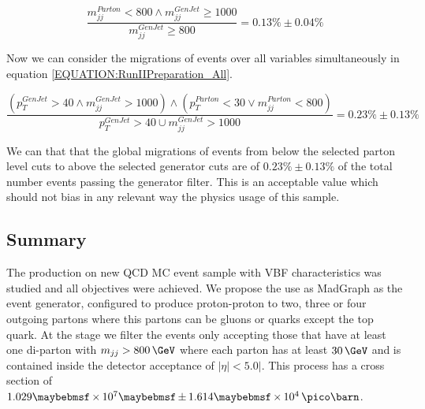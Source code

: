 \begin{equation}
\label{EQUATION:RunIIPreparation_SigleVariableMigrationMjj}
\frac{m_{jj}^{Parton}<800 \wedge m_{jj}^{GenJet} \geq 1000}{m_{jj}^{GenJet} \geq 800}=0.13\% \pm 0.04\%
\end{equation}
\normalsize

Now we can consider the migrations of events over all variables simultaneously in equation \ref{EQUATION:RunIIPreparation_All}.

\small
\begin{equation}
\label{EQUATION:RunIIPreparation_All}
\frac{(p_{T}^{GenJet}>40 \wedge m_{jj}^{GenJet}>1000) \wedge (p_{T}^{Parton}<30 \vee m_{jj}^{Parton}<800)}{p_{T}^{GenJet}>40 \cup m_{jj}^{GenJet}>1000} = 0.23\% \pm 0.13\%
\end{equation}
\normalsize

We can that that the global migrations of events from below the selected parton level cuts to above the selected generator cuts are of $0.23\% \pm 0.13\%$ of the total number events passing the generator filter. This is an acceptable value which should not bias in any relevant way the physics usage of this sample.

\subsection{Summary}
\label{SUBSECTION:RunIIPreparation_Summary}


The production on new \gls{QCD} \gls{MC} event sample with VBF characteristics was studied and all objectives were achieved. We propose the use as MadGraph as the event generator, configured to produce proton-proton to two, three or four outgoing partons where this partons can be gluons or quarks except the top quark. At the stage we filter the events only accepting those that have at least one di-parton with $m_{jj}>800\,\GeV$ where each parton has at least $30\,\GeV$ and is contained inside the detector acceptance of $|\eta|<5.0|$. This process has a cross section of $1.029 \times 10^7 \pm 1.614 \times 10^4 \,\pico\barn$. 

